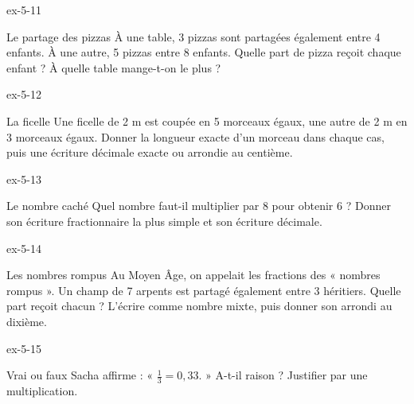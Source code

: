 \begin{blocLivre}{ex-5-11}\begin{exercice}[3]{Le partage des pizzas}
À une table, 3 pizzas sont partagées également entre 4 enfants. À une autre, 5 pizzas entre 8 enfants. Quelle part de pizza reçoit chaque enfant ? À quelle table mange-t-on le plus ?
\end{exercice}\end{blocLivre}
\begin{blocLivre}{ex-5-12}\begin{exercice}[3]{La ficelle}
Une ficelle de 2 m est coupée en 5 morceaux égaux, une autre de 2 m en 3 morceaux égaux. Donner la longueur exacte d’un morceau dans chaque cas, puis une écriture décimale exacte ou arrondie au centième.
\end{exercice}\end{blocLivre}
\begin{blocLivre}{ex-5-13}\begin{exercice}[3]{Le nombre caché}
Quel nombre faut-il multiplier par 8 pour obtenir 6 ? Donner son écriture fractionnaire la plus simple et son écriture décimale.
\end{exercice}\end{blocLivre}
\begin{blocLivre}{ex-5-14}\begin{exercice}[3]{Les nombres rompus}
Au Moyen Âge, on appelait les fractions des « nombres rompus ». Un champ de 7 arpents est partagé également entre 3 héritiers. Quelle part reçoit chacun ? L’écrire comme nombre mixte, puis donner son arrondi au dixième.
\end{exercice}\end{blocLivre}
\begin{blocLivre}{ex-5-15}\begin{exercice}[3]{Vrai ou faux}
Sacha affirme : « $\frac13=0{,}33$. » A-t-il raison ? Justifier par une multiplication.
\end{exercice}\end{blocLivre}

\clearpage
